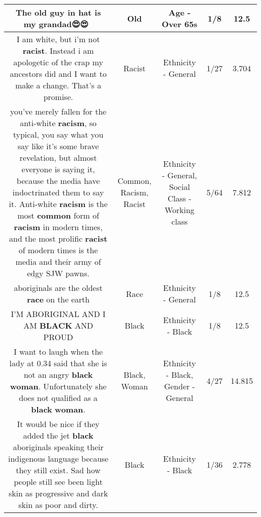 \documentclass[11pt]{article}
\newlength\mylength
\begin{document}
\begin{center}
\begin{longtable}{|C{.65\mylength}|C{.30\mylength}|C{.12\mylength}|C{.12\mylength}|C{.12\mylength}|}
  \small The \textbf{old} guy in hat is my grandad😍😍👌🏼\normalsize   & Old & Age - Over 65s & 1/8 & 12.5 \\  \hline
  \small I am white, but i'm not \textbf{racist}. Instead i am apologetic of the crap my ancestors did and I want to make a change. That's a promise.\normalsize   & Racist & Ethnicity - General & 1/27 & 3.704 \\  \hline
  \small you've merely fallen for the anti-white \textbf{racism}, so typical, you say what you say like it's some brave revelation, but almost everyone is saying it, because the media have indoctrinated them to say it. Anti-white \textbf{racism} is the most \textbf{common} form of \textbf{racism} in modern times, and the most prolific \textbf{racist} of modern times is the media and their army of edgy SJW pawns.\normalsize   & Common, Racism, Racist & Ethnicity - General, Social Class - Working class & 5/64 & 7.812 \\  \hline
  \small aboriginals are the oldest \textbf{race} on the earth\normalsize   & Race & Ethnicity - General & 1/8 & 12.5 \\  \hline
  \small I'M ABORIGINAL AND I AM \textbf{BLACK} AND PROUD\normalsize   & Black & Ethnicity - Black & 1/8 & 12.5 \\  \hline
  \small I want to laugh when the lady at 0.34 said that she is not an angry \textbf{black} \textbf{woman}. Unfortunately she does not qualified as a \textbf{black} \textbf{woman}.\normalsize   & Black, Woman & Ethnicity - Black, Gender - General & 4/27 & 14.815 \\  \hline
  \small It would be nice if they added the jet \textbf{black} aboriginals speaking their indigenous language because they still exist. Sad how people still see been light skin as progressive and dark skin as poor and dirty.\normalsize   & Black & Ethnicity - Black & 1/36 & 2.778 \\  \hline

\end{longtable}
\end{center}
\end{document}
